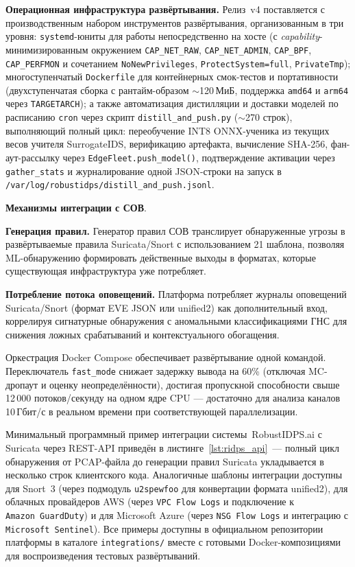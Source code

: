\noindent\textbf{Операционная инфраструктура развёртывания.} Релиз~v4
поставляется с производственным набором инструментов развёртывания,
организованным в три уровня: \texttt{systemd}-юниты для работы
непосредственно на хосте (с \emph{capability}-минимизированным
окружением \texttt{CAP\_NET\_RAW}, \texttt{CAP\_NET\_ADMIN},
\texttt{CAP\_BPF}, \texttt{CAP\_PERFMON} и сочетанием
\texttt{NoNewPrivileges}, \texttt{ProtectSystem=full},
\texttt{PrivateTmp}); многоступенчатый \texttt{Dockerfile} для
контейнерных смок-тестов и портативности (двухступенчатая сборка с
рантайм-образом $\sim$120\,МиБ, поддержка \texttt{amd64} и
\texttt{arm64} через \texttt{TARGETARCH}); а также автоматизация
дистилляции и доставки моделей по расписанию \texttt{cron} через
скрипт \texttt{distill\_and\_push.py} ($\sim$270 строк),
выполняющий полный цикл: переобучение INT8 ONNX-ученика из текущих
весов учителя \textsf{SurrogateIDS}, верификацию артефакта,
вычисление SHA-256, фан-аут-рассылку через
\texttt{EdgeFleet.push\_model()}, подтверждение активации через
\texttt{gather\_stats} и журналирование одной JSON-строки на запуск
в \texttt{/var/log/robustidps/distill\_and\_push.jsonl}.

\noindent\textbf{Механизмы интеграции с СОВ}.

\noindent\textbf{Генерация правил.} Генератор правил СОВ транслирует обнаруженные угрозы в развёртываемые правила Suricata/Snort с использованием 21 шаблона, позволяя ML-обнаружению формировать действенные выходы в форматах, которые существующая инфраструктура уже потребляет.

\noindent\textbf{Потребление потока оповещений.} Платформа потребляет журналы оповещений Suricata/Snort (формат EVE JSON или unified2) как дополнительный вход, коррелируя сигнатурные обнаружения с аномальными классификациями ГНС для снижения ложных срабатываний и контекстуального обогащения.

Оркестрация Docker Compose обеспечивает развёртывание одной командой. Переключатель \texttt{fast\_mode} снижает задержку вывода на 60\% (отключая MC-дропаут и оценку неопределённости), достигая пропускной способности свыше 12\,000 потоков/секунду на одном ядре CPU --- достаточно для анализа каналов 10\,Гбит/с в реальном времени при соответствующей параллелизации.

Минимальный программный пример интеграции системы~\textsf{RobustIDPS.ai}
с Suricata через REST-API приведён в листинге~\ref{lst:ridps_api}~---
полный цикл обнаружения от PCAP-файла до генерации правил Suricata
укладывается в несколько строк клиентского кода. Аналогичные шаблоны
интеграции доступны для Snort~3 (через подмодуль \texttt{u2spewfoo}
для конвертации формата unified2), для облачных провайдеров AWS
(через \texttt{VPC~Flow~Logs} и подключение к \texttt{Amazon~GuardDuty})
и для Microsoft Azure (через \texttt{NSG~Flow~Logs} и интеграцию с
\texttt{Microsoft~Sentinel}). Все примеры доступны в официальном
репозитории платформы в каталоге \texttt{integrations/} вместе с
готовыми Docker-композициями для воспроизведения тестовых развёртываний.

